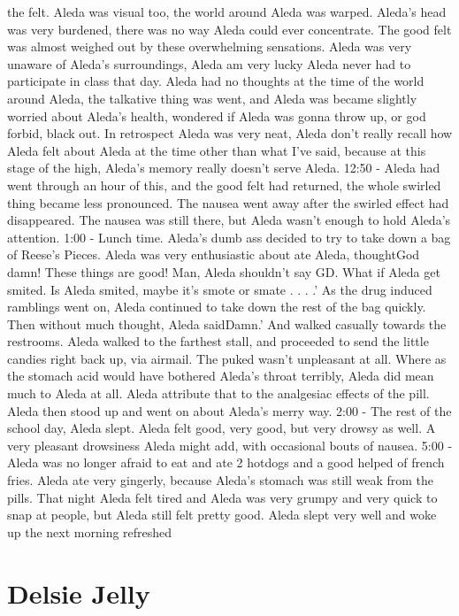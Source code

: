 \documentclass[12pt]{book}
\begin{document}
the felt. Aleda was visual too, the world around Aleda was warped. Aleda's head was very burdened, there was no way Aleda could ever concentrate. The good felt was almost weighed out by these overwhelming sensations. Aleda was very unaware of Aleda's surroundings, Aleda am very lucky Aleda never had to participate in class that day. Aleda had no thoughts at the time of the world around Aleda, the talkative thing was went, and Aleda was became slightly worried about Aleda's health, wondered if Aleda was gonna throw up, or god forbid, black out. In retrospect Aleda was very neat, Aleda don't really recall how Aleda felt about Aleda at the time other than what I've said, because at this stage of the high, Aleda's memory really doesn't serve Aleda. 12:50 - Aleda had went through an hour of this, and the good felt had returned, the whole swirled thing became less pronounced. The nausea went away after the swirled effect had disappeared. The nausea was still there, but Aleda wasn't enough to hold Aleda's attention. 1:00 - Lunch time. Aleda's dumb ass decided to try to take down a bag of Reese's Pieces. Aleda was very enthusiastic about ate Aleda, thoughtGod damn! These things are good! Man, Aleda shouldn't say GD. What if Aleda get smited. Is Aleda smited, maybe it's smote or smate . . .  .' As the drug induced ramblings went on, Aleda continued to take down the rest of the bag quickly. Then without much thought, Aleda saidDamn.' And walked casually towards the restrooms. Aleda walked to the farthest stall, and proceeded to send the little candies right back up, via airmail. The puked wasn't unpleasant at all. Where as the stomach acid would have bothered Aleda's throat terribly, Aleda did mean much to Aleda at all. Aleda attribute that to the analgesiac effects of the pill. Aleda then stood up and went on about Aleda's merry way. 2:00 - The rest of the school day, Aleda slept. Aleda felt good, very good, but very drowsy as well. A very pleasant drowsiness Aleda might add, with occasional bouts of nausea. 5:00 - Aleda was no longer afraid to eat and ate 2 hotdogs and a good helped of french fries. Aleda ate very gingerly, because Aleda's stomach was still weak from the pills. That night Aleda felt tired and Aleda was very grumpy and very quick to snap at people, but Aleda still felt pretty good. Aleda slept very well and woke up the next morning refreshed



\chapter{Delsie Jelly}
\end{document}
